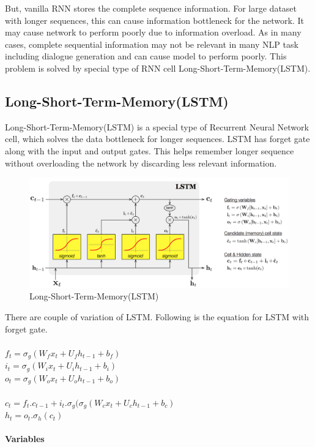 \documentclass[a4paper,12pt]{report}
\begin{document}
\noindent But, vanilla RNN stores the complete sequence information. For large dataset with longer sequences, this can cause information bottleneck for the network. It may cause network to perform poorly due to information overload. As in many cases, complete sequential information may not be relevant in many NLP task including dialogue generation and can cause model to perform poorly. This problem is solved by special type of RNN cell Long-Short-Term-Memory(LSTM).
\subsection {Long-Short-Term-Memory(LSTM)}
Long-Short-Term-Memory(LSTM) is a special type of Recurrent Neural Network cell, which solves the data bottleneck for longer sequences. LSTM has forget gate along with the input and output gates. This helps remember longer sequence without overloading the network by discarding less relevant information.
\begin{figure}[H]
\begin{center}
\includegraphics[scale=.22]{lstm2}
\caption{Long-Short-Term-Memory(LSTM)}
\end{center}
\end{figure}
\noindent There are couple of variation of LSTM. Following is the equation for LSTM with forget gate.\\\\
$f_t = \sigma_g(W_fx_t+ U_fh_{t-1}+b_f)$\\
$i_t = \sigma_g(W_ix_t+ U_ih_{t-1}+b_i)$\\
$o_t = \sigma_g(W_ox_t+ U_oh_{t-1}+b_o)$\\\\
$c_t = f_t . c_{t-1} +i_t.\sigma_g( \sigma_g(W_cx_t+ U_ch_{t-1}+b_c)$\\
$h_t = o_t . \sigma_h(c_t)$\\\\
\textbf{Variables}\\\\
\end{document}

